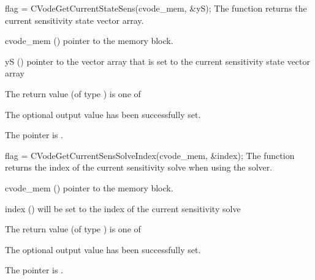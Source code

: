 {}
{
  flag = CVodeGetCurrentStateSens(cvode\_mem, \&yS);
}
{
  The function  returns the current sensitivity
  state vector array.
}
{
  \begin{args}
  \item[cvode\_mem] ()
    pointer to the {\cvode} memory block.
  \item[yS] ()
    pointer to the vector array that is set to the current sensitivity state vector array
  \end{args}
}
{
  The return value  (of type ) is one of
  \begin{args}
  \item[\Id{CV\_SUCCESS}]
    The optional output value has been successfully set.
  \item[\Id{CV\_MEM\_NULL}]
    The  pointer is .
  \end{args}
}
{}
{
  flag = CVodeGetCurrentSensSolveIndex(cvode\_mem, \&index);
}
{
  The function  returns the index of the
  current sensitivity solve when using the  solver.
}
{
  \begin{args}
  \item[cvode\_mem] ()
    pointer to the {\cvode} memory block.
  \item[index] ()
    will be set to the index of the current sensitivity solve
  \end{args}
}
{
  The return value  (of type ) is one of
  \begin{args}
  \item[\Id{CV\_SUCCESS}]
    The optional output value has been successfully set.
  \item[\Id{CV\_MEM\_NULL}]
    The  pointer is .
  \end{args}
}
{}





